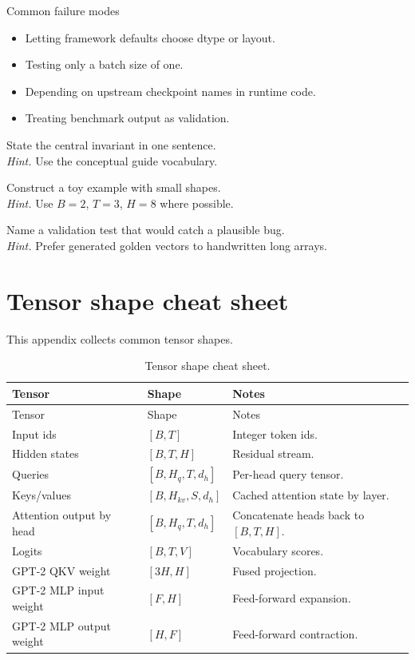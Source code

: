 \begin{warningbox}{Common failure modes}
\begin{itemize}
\item Letting framework defaults choose dtype or layout.
\item Testing only a batch size of one.
\item Depending on upstream checkpoint names in runtime code.
\item Treating benchmark output as validation.
\end{itemize}
\end{warningbox}

\begin{chapterexercises}
\item State the central invariant in one sentence.\\
\textit{Hint.} Use the conceptual guide vocabulary.
\item Construct a toy example with small shapes.\\
\textit{Hint.} Use $B=2$, $T=3$, $H=8$ where possible.
\item Name a validation test that would catch a plausible bug.\\
\textit{Hint.} Prefer generated golden vectors to handwritten long arrays.
\end{chapterexercises}

\chapter{Tensor shape cheat sheet}
\label{app:shape-cheat}
This appendix collects common tensor shapes.


{\small
\begin{longtable}{L{0.28\textwidth}L{0.28\textwidth}L{0.34\textwidth}}
\caption{Tensor shape cheat sheet.}\\
\toprule
Tensor & Shape & Notes \\
\midrule
\endfirsthead
\toprule
Tensor & Shape & Notes \\
\midrule
\endhead
Input ids & $[B,T]$ & Integer token ids. \\
Hidden states & $[B,T,H]$ & Residual stream. \\
Queries & $[B,H_q,T,d_h]$ & Per-head query tensor. \\
Keys/values & $[B,H_{kv},S,d_h]$ & Cached attention state by layer. \\
Attention output by head & $[B,H_q,T,d_h]$ & Concatenate heads back to $[B,T,H]$. \\
Logits & $[B,T,V]$ & Vocabulary scores. \\
GPT-2 QKV weight & $[3H,H]$ & Fused projection. \\
GPT-2 MLP input weight & $[F,H]$ & Feed-forward expansion. \\
GPT-2 MLP output weight & $[H,F]$ & Feed-forward contraction. \\
\bottomrule
\end{longtable}}


